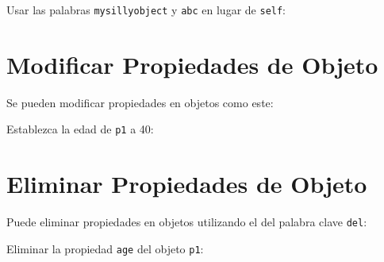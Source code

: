\begin{code}
Usar las palabras \texttt{mysillyobject} y \texttt{abc} en lugar de \texttt{self}:

\begin{Shaded}
\begin{Highlighting}[]
   
\OperatorTok{=}
\OperatorTok{=}

    \NormalTok{(} \OperatorTok{+}

\OperatorTok{=}\NormalTok{, }\NormalTok{)}
\end{Highlighting}
\end{Shaded}
\end{code}

\section{Modificar Propiedades de Objeto}

Se pueden modificar propiedades en objetos como este: \\

\begin{code} 
Establezca la edad de \texttt{p1} a 40:

\begin{Shaded}
\begin{Highlighting}[]
\OperatorTok{=} 
\end{Highlighting}
\end{Shaded}
\end{code}

\section{Eliminar Propiedades de Objeto}

Puede eliminar propiedades en objetos utilizando el del palabra clave \texttt{del}:\\

\begin{code}
Eliminar la propiedad \texttt{age} del objeto
\texttt{p1}:

\begin{Shaded}
\begin{Highlighting}[]
\end{Highlighting}
\end{Shaded}
\end{code}

